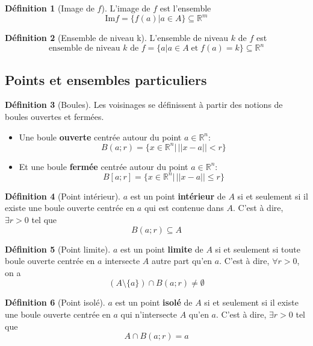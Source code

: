 \documentclass[11pt,a4paper]{article}
\theoremstyle{definition}
\newtheorem{mydef}{Définition}%
\newcommand{\R}{\mathbb{R}}
\begin{document}
\begin{mydef} [Image de $f$] L'image de $f$ est l'ensemble
	\[ \mathrm{Im} f = \{ f(a) | a \in A\} \subseteq \R^m \]
\end{mydef}

\begin{mydef} [Ensemble de niveau k]
	L'ensemble de niveau $k$ de $f$ est
	\[ \text{ensemble de niveau } k\text{ de }f = \{ a | a \in A \;\text{et}\; f(a) = k \} \subseteq \R^n \]
\end{mydef}


\subsection{Points et ensembles particuliers}

\begin{mydef} [Boules] Les voisinages se définissent à partir des notions de boules ouvertes et fermées.
	\begin{itemize}
		\item Une boule \textbf{ouverte} centrée autour du point $a \in \R^n$:
			\[ B(a;r) = \{ x \in \R^n |\,||x-a|| < r \} \]
		\item Et une boule \textbf{fermée} centrée autour du point $a \in \R^n$:
			\[ B[a;r] = \{ x \in \R^n |\,||x-a|| \leq r \} \]
	\end{itemize}
\end{mydef}

\begin{mydef}[Point intérieur]
	$a$ est un point \textbf{intérieur} de $A$ si et seulement si il existe une boule ouverte centrée en $a$ qui est contenue dans $A$.
	C'est à dire, $\exists r > 0$ tel que
	\[ B(a; r) \subseteq A \]
\end{mydef}

\begin{mydef} [Point limite]
	$a$ est un point \textbf{limite} de $A$ si et seulement si toute boule ouverte centrée en $a$ intersecte $A$ autre part qu'en $a$.
	C'est à dire, $\forall r > 0$, on a
	\[ (A \setminus \{a\}) \cap B(a; r) \neq \emptyset \]
\end{mydef}

\begin{mydef} [Point isolé]
	$a$ est un point \textbf{isolé} de $A$ si et seulement si il existe une boule ouverte centrée en $a$ qui n'intersecte $A$ qu'en $a$.
	C'est à dire, $\exists r > 0$ tel que
	\[ A \cap B(a; r) = a \]
\end{mydef}
\end{document}
